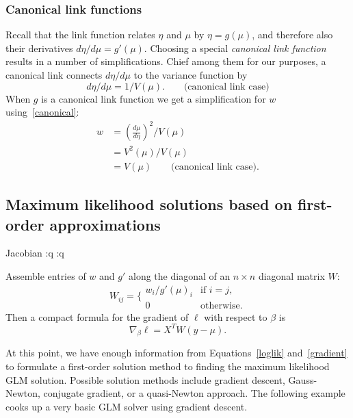 \documentclass[10pt]{article} %
\begin{document}
\subsubsection*{Canonical link functions}
Recall that
the link function relates $\eta$ and $\mu$ by $\eta=g(\mu)$,
and therefore also their derivatives $d\eta/d\mu = g'(\mu)$. Choosing a special \emph{canonical link function}
results in a number of simplifications. Chief among them for our
purposes, a canonical link connects $d\eta/d\mu$ to the variance function by
\begin{equation}
\label{canonical}
{d\eta}/{d\mu}={1}/{V(\mu)}.\qquad\mbox{(canonical link case)}
\end{equation}
When $g$ is a canonical link function we get a simplification
for $w$ using~\ref{canonical}:
\begin{align}
w &= \left(\frac{d\mu}{d\eta}\right)^2 \bigg/ V(\mu) \nonumber \\
&= V^2(\mu) / V(\mu) \nonumber \\
&= V(\mu)\qquad\mbox{(canonical link case)}.  \label{W_canonical}
\end{align}



\subsection*{Maximum likelihood solutions based on first-order approximations}

Jacobian :q
:q


Assemble entries of $w$ and $g'$ along the diagonal of an
$n\times n$ diagonal matrix $W$:
\begin{equation}\label{W}
W_{ij} = \bigg\{\begin{array}{cr}
w_i / g'(\mu)_i & \mbox{if $i=j$}, \\
0 & \mbox{otherwise}.
\end{array}
\end{equation}
Then a compact formula for the gradient of $\ell$ with respect to $\beta$ is
\begin{equation}\label{gradient}
\nabla_\beta\ell = X^TW(y - \mu).
\end{equation}

At this point, we have enough information from Equations~\ref{loglik}
and~\ref{gradient} to formulate a first-order solution method to finding the
maximum likelihood GLM solution.  Possible solution methods include gradient
descent, Gauss-Newton, conjugate gradient, or a quasi-Newton approach.
The following example cooks up a very basic GLM solver using gradient
descent.
\end{document}
